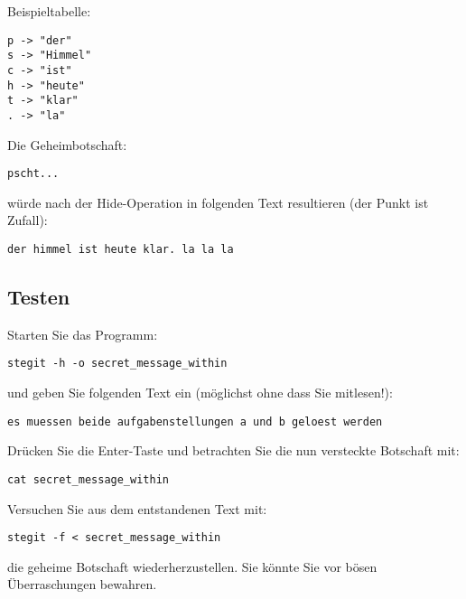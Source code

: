 \documentclass{article}
\begin{document}
Beispieltabelle:
\begin{verbatim}
p -> "der"
s -> "Himmel"
c -> "ist"
h -> "heute"
t -> "klar"
. -> "la"
\end{verbatim}
Die Geheimbotschaft:
\begin{verbatim}
pscht...
\end{verbatim}
würde nach der Hide-Operation in folgenden Text resultieren (der Punkt ist
Zufall):
\begin{verbatim}
der himmel ist heute klar. la la la
\end{verbatim}

\subsection*{Testen}
Starten Sie das Programm:
\begin{verbatim}
stegit -h -o secret_message_within
\end{verbatim}
und geben Sie folgenden Text ein (möglichst ohne dass Sie mitlesen!):
\begin{verbatim}
es muessen beide aufgabenstellungen a und b geloest werden
\end{verbatim}
Drücken Sie die Enter-Taste und betrachten Sie die nun versteckte Botschaft mit:
\begin{verbatim}
cat secret_message_within
\end{verbatim}
Versuchen Sie aus dem entstandenen Text mit:
\begin{verbatim}
stegit -f < secret_message_within
\end{verbatim}
die geheime Botschaft wiederherzustellen. Sie könnte Sie vor bösen
Überraschungen bewahren.
\end{document}
